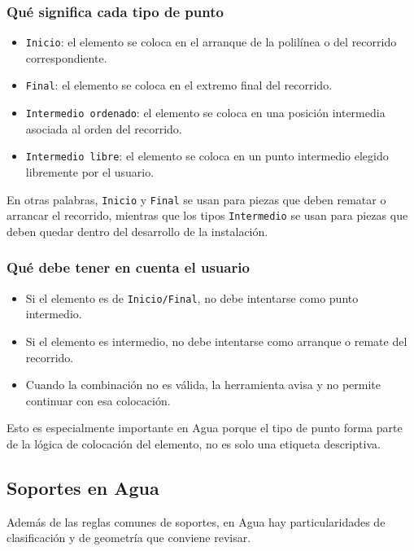 \documentclass[12pt,a4paper]{article}
\begin{document}
\subsubsection{Qué significa cada tipo de punto}

\begin{itemize}
\item \texttt{Inicio}: el elemento se coloca en el arranque de la polilínea o del recorrido correspondiente.
\item \texttt{Final}: el elemento se coloca en el extremo final del recorrido.
\item \texttt{Intermedio ordenado}: el elemento se coloca en una posición intermedia asociada al orden del recorrido.
\item \texttt{Intermedio libre}: el elemento se coloca en un punto intermedio elegido libremente por el usuario.
\end{itemize}

En otras palabras, \texttt{Inicio} y \texttt{Final} se usan para piezas que deben rematar o arrancar el recorrido, mientras que los tipos \texttt{Intermedio} se usan para piezas que deben quedar dentro del desarrollo de la instalación.

\subsubsection{Qué debe tener en cuenta el usuario}

\begin{itemize}
\item Si el elemento es de \texttt{Inicio/Final}, no debe intentarse como punto intermedio.
\item Si el elemento es intermedio, no debe intentarse como arranque o remate del recorrido.
\item Cuando la combinación no es válida, la herramienta avisa y no permite continuar con esa colocación.
\end{itemize}

Esto es especialmente importante en Agua porque el tipo de punto forma parte de la lógica de colocación del elemento, no es solo una etiqueta descriptiva.

\subsection{Soportes en Agua}

Además de las reglas comunes de soportes, en Agua hay particularidades de clasificación y de geometría que conviene revisar.
\end{document}
